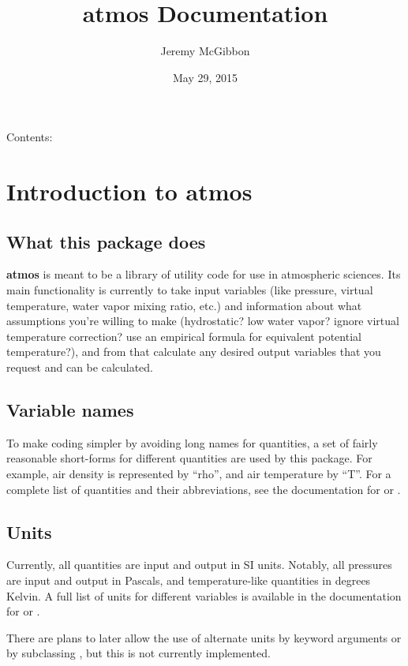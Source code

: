 \documentclass[letterpaper,10pt,english]{sphinxmanual}
\title{atmos Documentation}
\date{May 29, 2015}
\author{Jeremy McGibbon}
\begin{document}
\maketitle
\tableofcontents
{}\label{index::doc}


Contents:


\chapter{Introduction to atmos}
\label{intro:welcome-to-atmos-s-documentation}\label{intro::doc}\label{intro:introduction-to-atmos}

\section{What this package does}
\label{intro:what-this-package-does}
\textbf{atmos} is meant to be a library of utility code for use in atmospheric
sciences. Its main functionality is currently to take input variables (like
pressure, virtual temperature, water vapor mixing ratio, etc.) and information
about what assumptions you're willing to make (hydrostatic? low water vapor?
ignore virtual temperature correction? use an empirical formula for
equivalent potential temperature?), and from that calculate any desired
output variables that you request and can be calculated.


\section{Variable names}
\label{intro:variable-names}
To make coding simpler by avoiding long names for quantities, a set of fairly
reasonable short-forms for different quantities are used by this package.
For example, air density is represented by ``rho'', and air temperature by ``T''.
For a complete list of quantities and their abbreviations, see the
documentation for  or .


\section{Units}
\label{intro:units}
Currently, all quantities are input and output in SI units. Notably, all
pressures are input and output in Pascals, and temperature-like quantities
in degrees Kelvin. A full list of units for different variables is available
in the documentation for  or
.

There are plans to later allow the use of alternate units by keyword arguments
or by subclassing , but this is not currently
implemented.
\end{document}
